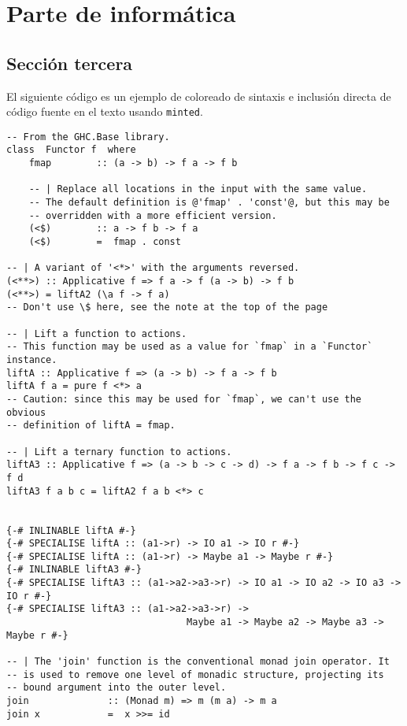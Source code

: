 \documentclass[oneside,openright,titlepage,numbers=noenddot,openany,headinclude,footinclude=true,
cleardoublepage=empty,abstractoff,BCOR=5mm,paper=a4,fontsize=12pt,main=spanish]{scrreprt}
\begin{document}

\part{Parte de informática}
\chapter{Sección tercera}
El siguiente código es un ejemplo de coloreado de sintaxis e inclusión
directa de código fuente en el texto usando \texttt{minted}.

\begin{verbatim}
-- From the GHC.Base library.
class  Functor f  where
    fmap        :: (a -> b) -> f a -> f b

    -- | Replace all locations in the input with the same value.
    -- The default definition is @'fmap' . 'const'@, but this may be
    -- overridden with a more efficient version.
    (<$)        :: a -> f b -> f a
    (<$)        =  fmap . const

-- | A variant of '<*>' with the arguments reversed.
(<**>) :: Applicative f => f a -> f (a -> b) -> f b
(<**>) = liftA2 (\a f -> f a)
-- Don't use \$ here, see the note at the top of the page

-- | Lift a function to actions.
-- This function may be used as a value for `fmap` in a `Functor` instance.
liftA :: Applicative f => (a -> b) -> f a -> f b
liftA f a = pure f <*> a
-- Caution: since this may be used for `fmap`, we can't use the obvious
-- definition of liftA = fmap.

-- | Lift a ternary function to actions.
liftA3 :: Applicative f => (a -> b -> c -> d) -> f a -> f b -> f c -> f d
liftA3 f a b c = liftA2 f a b <*> c


{-# INLINABLE liftA #-}
{-# SPECIALISE liftA :: (a1->r) -> IO a1 -> IO r #-}
{-# SPECIALISE liftA :: (a1->r) -> Maybe a1 -> Maybe r #-}
{-# INLINABLE liftA3 #-}
{-# SPECIALISE liftA3 :: (a1->a2->a3->r) -> IO a1 -> IO a2 -> IO a3 -> IO r #-}
{-# SPECIALISE liftA3 :: (a1->a2->a3->r) ->
                                Maybe a1 -> Maybe a2 -> Maybe a3 -> Maybe r #-}

-- | The 'join' function is the conventional monad join operator. It
-- is used to remove one level of monadic structure, projecting its
-- bound argument into the outer level.
join              :: (Monad m) => m (m a) -> m a
join x            =  x >>= id
\end{verbatim}
\end{document}
